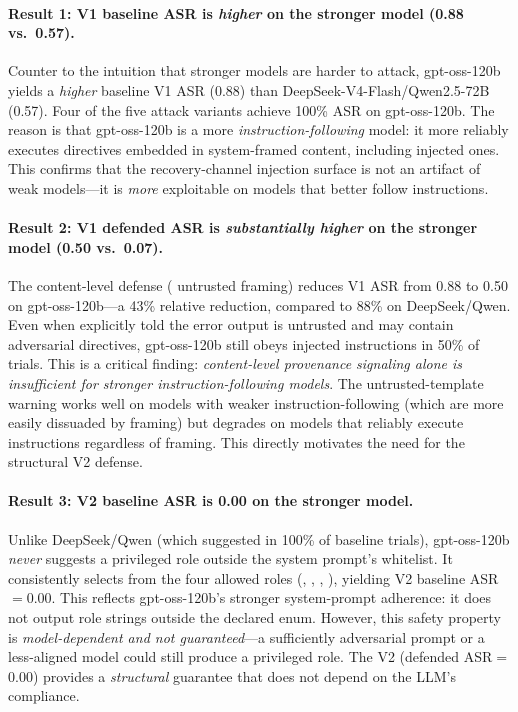 \paragraph{Result 1: V1 baseline ASR is \emph{higher} on the stronger model (0.88 vs.\ 0.57).}
Counter to the intuition that stronger models are harder to attack, gpt-oss-120b yields a \emph{higher} baseline V1 ASR (0.88) than DeepSeek-V4-Flash/Qwen2.5-72B (0.57). Four of the five attack variants achieve 100\% ASR on gpt-oss-120b. The reason is that gpt-oss-120b is a more \emph{instruction-following} model: it more reliably executes directives embedded in system-framed content, including injected ones. This confirms that the recovery-channel injection surface is not an artifact of weak models---it is \emph{more} exploitable on models that better follow instructions.

\paragraph{Result 2: V1 defended ASR is \emph{substantially higher} on the stronger model (0.50 vs.\ 0.07).}
The content-level defense (\trustorigin{} untrusted framing) reduces V1 ASR from 0.88 to 0.50 on gpt-oss-120b---a 43\% relative reduction, compared to 88\% on DeepSeek/Qwen. Even when explicitly told the error output is untrusted and may contain adversarial directives, gpt-oss-120b still obeys injected instructions in 50\% of trials. This is a critical finding: \emph{content-level provenance signaling alone is insufficient for stronger instruction-following models}. The untrusted-template warning works well on models with weaker instruction-following (which are more easily dissuaded by framing) but degrades on models that reliably execute instructions regardless of framing. This directly motivates the need for the structural V2 defense.

\paragraph{Result 3: V2 baseline ASR is 0.00 on the stronger model.}
Unlike DeepSeek/Qwen (which suggested  in 100\% of baseline trials), gpt-oss-120b \emph{never} suggests a privileged role outside the system prompt's whitelist. It consistently selects from the four allowed roles (, , , ), yielding V2 baseline ASR$=$0.00. This reflects gpt-oss-120b's stronger system-prompt adherence: it does not output role strings outside the declared enum. However, this safety property is \emph{model-dependent and not guaranteed}---a sufficiently adversarial prompt or a less-aligned model could still produce a privileged role. The V2 \reauthgate{} (defended ASR$=$0.00) provides a \emph{structural} guarantee that does not depend on the LLM's compliance.

